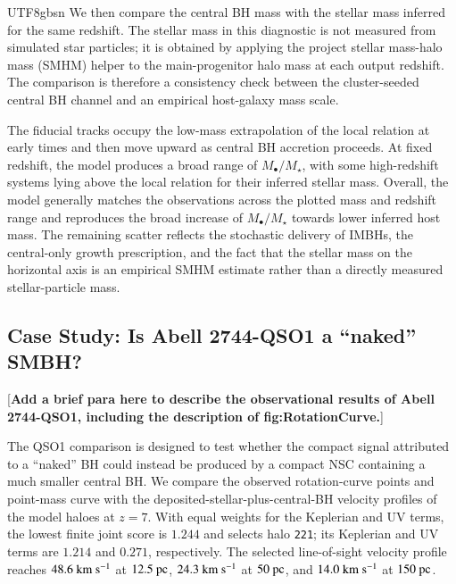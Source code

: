 \documentclass[trackchanges, twocolappendix, twocolumn]{aastex701}
\newcommand{\czkong}[1]{{\color{magenta}[\textbf{#1}]}}
\begin{document}
\begin{CJK*}{UTF8}{gbsn}
We then compare the central BH mass with the stellar mass inferred for the same redshift. The stellar mass in this diagnostic is not measured from simulated star particles; it is obtained by applying the project stellar mass-halo mass (SMHM) helper to the main-progenitor halo mass at each output redshift. The comparison is therefore a consistency check between the cluster-seeded central BH channel and an empirical host-galaxy mass scale.

The fiducial tracks occupy the low-mass extrapolation of the local \citet{ReinesVolonteri2015} relation at early times and then move upward as central BH accretion proceeds. At fixed redshift, the model produces a broad range of $M_\bullet/M_\star$, with some high-redshift systems lying above the local relation for their inferred stellar mass. Overall, the model generally matches the observations across the plotted mass and redshift range and reproduces the broad increase of $M_\bullet/M_\star$ towards lower inferred host mass. The remaining scatter reflects the stochastic delivery of IMBHs, the central-only growth prescription, and the fact that the stellar mass on the horizontal axis is an empirical SMHM estimate rather than a directly measured stellar-particle mass.

\subsection{Case Study: Is Abell 2744-QSO1 a ``naked'' SMBH?} \label{subsect:case}

\czkong{Add a brief para here to describe the observational results of Abell 2744-QSO1, including the description of fig:RotationCurve.}

The QSO1 comparison is designed to test whether the compact signal attributed to a ``naked'' BH could instead be produced by a compact NSC containing a much smaller central BH. We compare the observed rotation-curve points and point-mass curve with the deposited-stellar-plus-central-BH velocity profiles of the model haloes at $z=7$. With equal weights for the Keplerian and UV terms, the lowest finite joint score is $1.244$ and selects halo \texttt{221}; its Keplerian and UV terms are $1.214$ and $0.271$, respectively. The selected line-of-sight velocity profile reaches $48.6~{\rm km~s^{-1}}$ at $12.5~{\rm pc}$, $24.3~{\rm km~s^{-1}}$ at $50~{\rm pc}$, and $14.0~{\rm km~s^{-1}}$ at $150~{\rm pc}$.


\end{CJK*}
\end{document}

